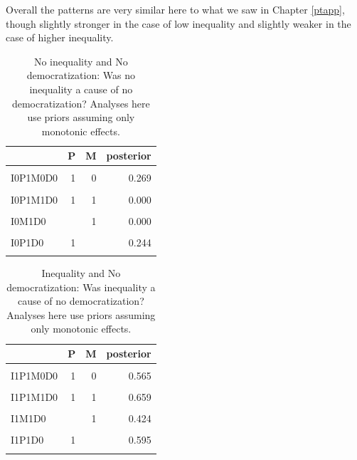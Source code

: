 \documentclass[
  12pt,
]{book}
\begin{document}
Overall the patterns are very similar here to what we saw in Chapter \ref{ptapp}, though slightly stronger in the case of low inequality and slightly weaker in the case of higher inequality.

\begin{table}

\caption{\label{tab:Tapp101}No inequality and No democratization: Was no inequality a cause of no democratization? Analyses here use priors assuming only monotonic effects.}
\centering
\begin{tabular}[t]{lrrr}
\toprule
  & P & M & posterior\\
\midrule
\cellcolor{gray!6}{I0P0M0D0} & \cellcolor{gray!6}{0} & \cellcolor{gray!6}{0} & \cellcolor{gray!6}{0.127}\\
I0P1M0D0 & 1 & 0 & 0.269\\
\cellcolor{gray!6}{I0P0M1D0} & \cellcolor{gray!6}{0} & \cellcolor{gray!6}{1} & \cellcolor{gray!6}{0.000}\\
I0P1M1D0 & 1 & 1 & 0.000\\
\cellcolor{gray!6}{I0M0D0} & \cellcolor{gray!6}{} & \cellcolor{gray!6}{0} & \cellcolor{gray!6}{0.145}\\
\addlinespace
I0M1D0 &  & 1 & 0.000\\
\cellcolor{gray!6}{I0P0D0} & \cellcolor{gray!6}{0} & \cellcolor{gray!6}{} & \cellcolor{gray!6}{0.101}\\
I0P1D0 & 1 &  & 0.244\\
\cellcolor{gray!6}{I0D0} & \cellcolor{gray!6}{} & \cellcolor{gray!6}{} & \cellcolor{gray!6}{0.117}\\
\bottomrule
\end{tabular}
\end{table}

\begin{table}

\caption{\label{tab:Tapp102}Inequality and No democratization: Was inequality a cause of no democratization? Analyses here use priors assuming only monotonic effects.}
\centering
\begin{tabular}[t]{lrrr}
\toprule
  & P & M & posterior\\
\midrule
\cellcolor{gray!6}{I1P0M0D0} & \cellcolor{gray!6}{0} & \cellcolor{gray!6}{0} & \cellcolor{gray!6}{0.246}\\
I1P1M0D0 & 1 & 0 & 0.565\\
\cellcolor{gray!6}{I1P0M1D0} & \cellcolor{gray!6}{0} & \cellcolor{gray!6}{1} & \cellcolor{gray!6}{0.392}\\
I1P1M1D0 & 1 & 1 & 0.659\\
\cellcolor{gray!6}{I1M0D0} & \cellcolor{gray!6}{} & \cellcolor{gray!6}{0} & \cellcolor{gray!6}{0.308}\\
\addlinespace
I1M1D0 &  & 1 & 0.424\\
\cellcolor{gray!6}{I1P0D0} & \cellcolor{gray!6}{0} & \cellcolor{gray!6}{} & \cellcolor{gray!6}{0.311}\\
I1P1D0 & 1 &  & 0.595\\
\cellcolor{gray!6}{I1D0} & \cellcolor{gray!6}{} & \cellcolor{gray!6}{} & \cellcolor{gray!6}{0.357}\\
\bottomrule
\end{tabular}
\end{table}
\end{document}

